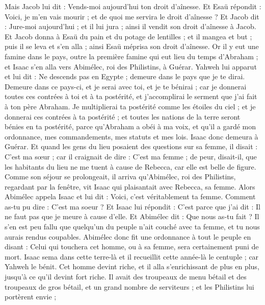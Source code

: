 \begin{multicols}{2}
Mais Jacob lui dit : Vends-moi aujourd'hui ton droit d'aînesse.
Et Esaü répondit : Voici, je m'en vais mourir ; et de quoi me servira le droit d'aînesse ?
Et Jacob dit : Jure-moi aujourd'hui ; et il lui jura ; ainsi il vendit son droit d'aînesse à Jacob.
Et Jacob donna à Esaü du pain et du potage de lentilles ; et il mangea et but ; puis il se leva et s'en alla ; ainsi Esaü méprisa son droit d'aînesse.
\VerseOne{}Or il y eut une famine dans le pays, outre la première famine qui eut lieu du temps d'Abraham ; et Isaac s'en alla vers Abimélec, roi des Philistins, à Guérar.
Yahweh lui apparut et lui dit : Ne descends pas en Egypte ; demeure dans le pays que je te dirai.
Demeure dans ce pays-ci, et je serai avec toi, et je te bénirai ; car je donnerai toutes ces contrées à toi et à ta postérité, et j'accomplirai le serment que j'ai fait à ton père Abraham.
Je multiplierai ta postérité comme les étoiles du ciel ; et je donnerai ces contrées à ta postérité ; et toutes les nations de la terre seront bénies en ta postérité,
parce qu'Abraham a obéi à ma voix, et qu'il a gardé mon ordonnance, mes commandements, mes statuts et mes lois.
Isaac donc demeura à Guérar.
Et quand les gens du lieu posaient des questions sur sa femme, il disait : C'est ma sœur ; car il craignait de dire : C'est ma femme ; de peur, disait-il, que les habitants du lieu ne me tuent à cause de Rebecca, car elle est belle de figure.
Comme son séjour se prolongeait, il arriva qu'Abimélec, roi des Philistins, regardant par la fenêtre, vit Isaac qui plaisantait avec Rebecca, sa femme.
Alors Abimélec appela Isaac et lui dit : Voici, c'est véritablement ta femme. Comment as-tu pu dire : C'est ma soeur ? Et Isaac lui répondit : C'est parce que j'ai dit : Il ne faut pas que je meure à cause d'elle.
Et Abimélec dit : Que nous as-tu fait ? Il s'en est peu fallu que quelqu'un du peuple n'ait couché avec ta femme, et tu nous aurais rendus coupables.
Abimélec donc fit une ordonnance à tout le peuple en disant : Celui qui touchera cet homme, ou à sa femme, sera certainement puni de mort.
Isaac sema dans cette terre-là et il recueillit cette année-là le centuple ; car Yahweh le bénit.
Cet homme devint riche, et il alla s'enrichissant de plus en plus, jusqu'à ce qu'il devint fort riche.
Il avait des troupeaux de menu bétail et des troupeaux de gros bétail, et un grand nombre de serviteurs ; et les Philistins lui portèrent envie ; 

\end{multicols}
